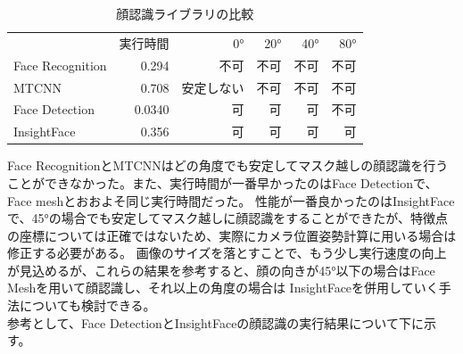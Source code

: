 \documentclass[]{jarticle}          %
\begin{document}
\begin{table}[ht!]
  \begin{center}
    \begin{tabular}{lrrrrr}
       & 実行時間 & 0° & 20° & 40° & 80° \\
      Face Recognition & 0.294 & 不可 & 不可 & 不可 & 不可 \\
      MTCNN & 0.708 & 安定しない & 不可 & 不可 & 不可 \\
      Face Detection & 0.0340 & 可 & 可 & 可 & 不可 \\
      InsightFace & 0.356 & 可 & 可 & 可 & 可
    \end{tabular}
    \caption{顔認識ライブラリの比較}
    \label{eight}
  \end{center}
\end{table}
Face RecognitionとMTCNNはどの角度でも安定してマスク越しの顔認識を行うことができなかった。また、実行時間が一番早かったのはFace Detectionで、Face meshとおおよそ同じ実行時間だった。
性能が一番良かったのはInsightFaceで、45°の場合でも安定してマスク越しに顔認識をすることができたが、特徴点の座標については正確ではないため、実際にカメラ位置姿勢計算に用いる場合は修正する必要がある。
画像のサイズを落とすことで、もう少し実行速度の向上が見込めるが、これらの結果を参考すると、顔の向きが45°以下の場合はFace Meshを用いて顔認識し、それ以上の角度の場合は
InsightFaceを併用していく手法についても検討できる。 \\
参考として、Face DetectionとInsightFaceの顔認識の実行結果について下に示す。
\end{document}
